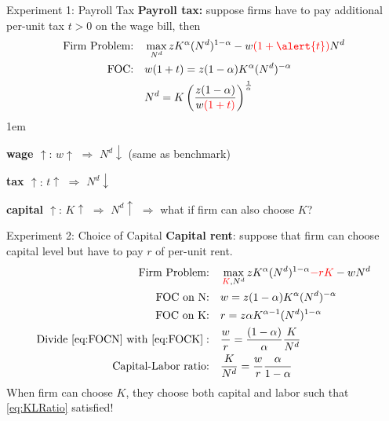 \documentclass[11pt,aspectratio=43]{beamer}
\newcommand{\red}[1]{\textcolor{red}{#1}}
\let\olditemize=\itemize
\let\endolditemize=\enditemize
\renewenvironment{itemize}{\olditemize \itemsep1em}{\endolditemize}
\theoremstyle{definition}
\begin{document}
\begin{frame}{Experiment 1: Payroll Tax}
\label{slide:Experiment_1__Payroll_Tax}
    \textbf{Payroll tax:} suppose firms have to pay additional per-unit tax $ t > 0$ on the wage bill, then
    \begin{align}
        \text{Firm Problem:} \quad
            & \max_{N^{d}} z K^{\alpha} ( N^{d} )^{1-\alpha} - w \red{( 1+\alert{t} )} N^{d}
        \\
        \text{FOC:} \quad
            & w( 1+t ) = z ( 1-\alpha ) K^{\alpha} ( N^{d} )^{-\alpha}
        \\
            & N^{d} = K \left(
                \frac{z ( 1-\alpha )}{w \red{( 1+t )}}
            \right)^{\frac{1}{\alpha}}
    \end{align}
    \begin{itemize}
        \item \textbf{wage $ \uparrow  $}: $ w \uparrow  $ $ \Rightarrow  $ $ N^{d} \downarrow  $ (same as benchmark)
        \item \textbf{tax $ \uparrow  $}: $ t \uparrow  $ $ \Rightarrow  $ $ N^{d} \downarrow  $
        \item \textbf{capital $ \uparrow  $}: $ K \uparrow  $ $ \Rightarrow  $ $ N^{d} \uparrow  $ $ \Rightarrow  $ \alert{what if firm can also choose $ K $?}
    \end{itemize}
\end{frame}

\begin{frame}{Experiment 2: Choice of Capital}
\label{slide:Experiment_2__Choice_of_Capital}
    \textbf{Capital rent}: suppose that firm can choose capital level but have to pay $ r $ of per-unit rent.
    \begin{align}
        \text{Firm Problem:} \quad
            & \max_{\red{K}, N^{d}} z K^{\alpha} ( N^{d} )^{1-\alpha} \red{- r K} - w N^{d}
        \\
        \text{FOC on N:} \quad
            & w = z ( 1-\alpha ) K^{\alpha} ( N^{d} )^{-\alpha}
            \label{eq:FOCN}
        \\
        \text{FOC on K:} \quad
            & r = z \alpha K^{\alpha-1} ( N^{d} )^{1-\alpha}
            \label{eq:FOCK}
        \\
        \text{Divide } \eqref{eq:FOCN} \text{ with } \eqref{eq:FOCK}: \quad
            & \frac{w}{r} = \frac{( 1-\alpha )}{\alpha} \frac{K}{N^{d}}
        \\
        \text{Capital-Labor ratio:} \quad
            & \frac{K}{N^{d}} = \frac{w}{r} \frac{\alpha}{1-\alpha}
            \label{eq:KLRatio}
    \end{align}
    When firm can choose $ K $, they choose both capital and labor such that \eqref{eq:KLRatio} satisfied!
\end{frame}
\end{document}
